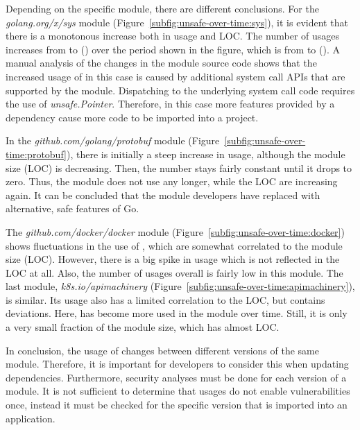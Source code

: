 Depending on the specific module, there are different conclusions.
For the \textit{golang.org/x/sys} module (Figure~\ref{subfig:unsafe-over-time:sys}), it is evident that there is a
monotonous increase both in \unsafe{} usage and \acrshort{LOC}.
The number of \unsafe{} usages increases from \sysModuleLeastUnsafe{} to \sysModuleMostUnsafe{}
(\sysModuleUnsafeIncrease) over the period shown in the figure, which is from  to
 ().
A manual analysis of the changes in the module source code shows that the increased usage of \unsafe{} in this case is
caused by additional system call \acrshort{API}s that are supported by the module.
Dispatching to the underlying system call code requires the use of \textit{unsafe.Pointer}.
Therefore, in this case more features provided by a dependency cause more \unsafe{} code to be imported into a project.

In the \textit{github.com/golang/protobuf} module (Figure~\ref{subfig:unsafe-over-time:protobuf}), there is initially a
steep increase in \unsafe{} usage, although the module size (\acrshort{LOC}) is decreasing.
Then, the number stays fairly constant until it drops to zero.
Thus, the module does not use \unsafe{} any longer, while the \acrshort{LOC} are increasing again.
It can be concluded that the module developers have replaced \unsafe{} with alternative, safe features of Go.

The \textit{github.com/docker/docker} module (Figure~\ref{subfig:unsafe-over-time:docker}) shows fluctuations in the use
of \unsafe{}, which are somewhat correlated to the module size (\acrshort{LOC}).
However, there is a big spike in \unsafe{} usage which is not reflected in the \acrshort{LOC} at all.
Also, the number of \unsafe{} usages overall is fairly low in this module.
The last module, \textit{k8s.io/apimachinery} (Figure~\ref{subfig:unsafe-over-time:apimachinery}), is similar.
Its \unsafe{} usage also has a limited correlation to the \acrshort{LOC}, but contains deviations.
Here, \unsafe{} has become more used in the module over time.
Still, it is only a very small fraction of the module size, which has almost  \acrshort{LOC}.

In conclusion, the usage of \unsafe{} changes between different versions of the same module.
Therefore, it is important for developers to consider this when updating dependencies.
Furthermore, security analyses must be done for each version of a module.
It is not sufficient to determine that \unsafe{} usages do not enable vulnerabilities once, instead it must be checked
for the specific version that is imported into an application.

